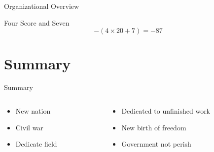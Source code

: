 \documentclass{beamer}
\begin{document}
\begin{frame}{Organizational Overview}

\begin{figure}
\end{figure}

\begin{block}{Four Score and Seven}
\[
-(4 \times 20 + 7) = -87
\]
\end{block}

\end{frame}

\section{Summary}

\begin{frame}{Summary}

\begin{columns}
\begin{column}{0.4\textwidth}
\begin{itemize}
\item New nation
\item Civil war
\item Dedicate field
\end{itemize}
\end{column}
\begin{column}{0.6\textwidth}
\begin{itemize}
\item Dedicated to unfinished work
\item New birth of freedom
\item Government not perish
\end{itemize}
\end{column}
\end{columns}

\end{frame}
\end{document}
